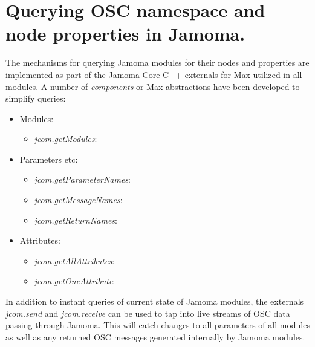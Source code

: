 \documentclass{article}
\begin{document}
%

\section{Querying OSC namespace and node properties in Jamoma.}  
 
The mechanisms for querying Jamoma modules for their nodes and properties are implemented as part of the Jamoma Core C++ externals for Max utilized in all modules. A number of \emph{components} or Max abstractions have been developed to simplify queries:

\begin{itemize}
	
	\item Modules:
	
	\begin{itemize}
		
		\item \emph{jcom.getModules}: 

	\end{itemize}
	
	\item Parameters etc:
	
	\begin{itemize}

		\item \emph{jcom.getParameterNames}:
	
		\item \emph{jcom.getMessageNames}:
	
		\item \emph{jcom.getReturnNames}:
		
	\end{itemize}
	
	\item Attributes:
	
	\begin{itemize}

		\item \emph{jcom.getAllAttributes}:
	
		\item \emph{jcom.getOneAttribute}:
		
		\end{itemize}
		
\end{itemize}

In addition to instant queries of current state of Jamoma modules, the externals \emph{jcom.send} and \emph{jcom.receive} can be used to tap into live streams of OSC data passing through Jamoma. This will catch changes to all parameters of all modules as well as any returned OSC messages generated internally by Jamoma modules.
\end{document}

